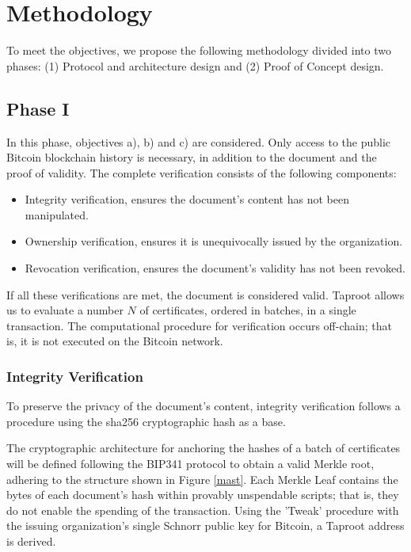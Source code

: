 \section{Methodology}
\label{methodology}

To meet the objectives, we propose the following methodology divided into two phases: (1) Protocol and architecture design and (2) Proof of Concept design.

\subsection{Phase I}

In this phase, objectives a), b) and c) are considered.
Only access to the public Bitcoin blockchain history is necessary, in addition to the document and the proof of validity.
The complete verification consists of the following components:

\begin{itemize}
    \item Integrity verification, ensures the document's content has not been manipulated.
    \item Ownership verification, ensures it is unequivocally issued by the organization.
    \item Revocation verification, ensures the document's validity has not been revoked.
\end{itemize}

If all these verifications are met, the document is considered valid.
Taproot allows us to evaluate a number $N$ of certificates, ordered in batches, in a single transaction.
The computational procedure for verification occurs off-chain; that is, it is not executed on the Bitcoin network.

\subsubsection{Integrity Verification}

To preserve the privacy of the document's content, integrity verification follows a procedure using the sha256 cryptographic hash as a base.

The cryptographic architecture for anchoring the hashes of a batch of certificates will be defined following the BIP341 protocol to obtain a valid Merkle root, adhering to the structure shown in Figure \ref{mast}.
Each Merkle Leaf contains the bytes of each document's hash within provably unspendable scripts; that is, they do not enable the spending of the transaction.
Using the 'Tweak' procedure with the issuing organization's single Schnorr public key for Bitcoin, a Taproot address is derived.

